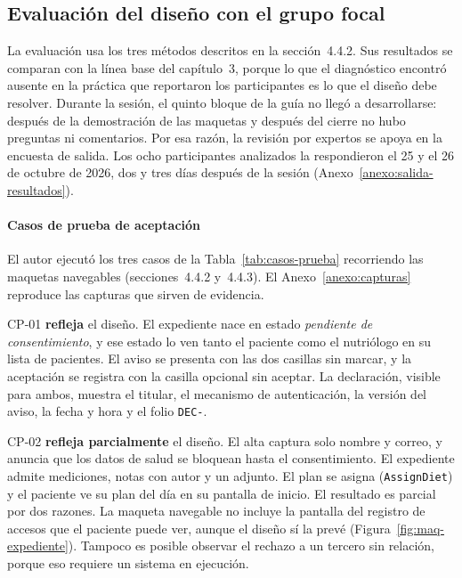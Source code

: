 \documentclass[12pt, a4paper]{article}
\begin{document}
\subsection{Evaluación del diseño con el grupo focal}
 
La evaluación usa los tres métodos descritos en la sección~4.4.2. Sus
resultados se comparan con la línea base del capítulo~3, porque lo que
el diagnóstico encontró ausente en la práctica que reportaron los
participantes es lo que el diseño debe resolver. Durante la sesión, el
quinto bloque de la guía no llegó a desarrollarse: después de la
demostración de las maquetas y después del cierre no hubo preguntas ni
comentarios. Por esa razón, la revisión por expertos se apoya en la
encuesta de salida. Los ocho participantes analizados la respondieron el
25 y el 26 de octubre de 2026, dos y tres días después de la sesión
(Anexo~\ref{anexo:salida-resultados}).

\paragraph{Casos de prueba de aceptación}
El autor ejecutó los tres casos de la Tabla~\ref{tab:casos-prueba}
recorriendo las maquetas navegables (secciones~4.4.2 y~4.4.3). El
Anexo~\ref{anexo:capturas} reproduce las capturas que sirven de
evidencia.

CP-01 \textbf{refleja} el diseño. El expediente nace en estado
\textit{pendiente de consentimiento}, y ese estado lo ven tanto el
paciente como el nutriólogo en su lista de pacientes. El aviso se
presenta con las dos casillas sin marcar, y la aceptación se registra
con la casilla opcional sin aceptar. La declaración, visible para ambos,
muestra el titular, el mecanismo de autenticación, la versión del aviso,
la fecha y hora y el folio \texttt{DEC-}.

CP-02 \textbf{refleja parcialmente} el diseño. El alta captura solo
nombre y correo, y anuncia que los datos de salud se bloquean hasta el
consentimiento. El expediente admite mediciones, notas con autor y un
adjunto. El plan se asigna (\texttt{AssignDiet}) y el paciente ve su
plan del día en su pantalla de inicio. El resultado es parcial por dos
razones. La maqueta navegable no incluye la pantalla del registro de
accesos que el paciente puede ver, aunque el diseño sí la prevé
(Figura~\ref{fig:maq-expediente}). Tampoco es posible observar el
rechazo a un tercero sin relación, porque eso requiere un sistema en
ejecución.
\end{document}
